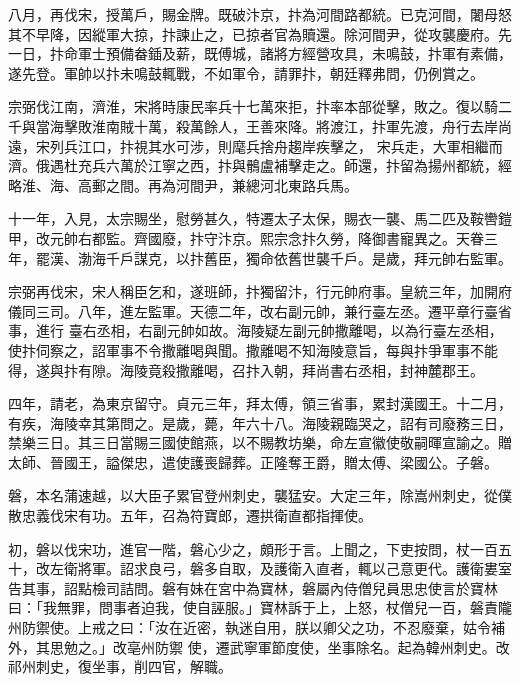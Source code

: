 \begin{pinyinscope}
 八月，再伐宋，授萬戶，賜金牌。既破汴京，抃為河間路都統。已克河間，闍母怒其不早降，因縱軍大掠，抃諫止之，已掠者官為贖還。除河間尹，從攻襲慶府。先一日，抃命軍士預備畚鍤及薪，既傅城，諸將方經營攻具，未鳴鼓，抃軍有素備，遂先登。軍帥以抃未鳴鼓輒戰，不如軍令，請罪抃，朝廷釋弗問，仍例賞之。



 宗弼伐江南，濟淮，宋將時康民率兵十七萬來拒，抃率本部從擊，敗之。復以騎二千與當海擊敗淮南賊十萬，殺萬餘人，王善來降。將渡江，抃軍先渡，舟行去岸尚遠，宋列兵江口，抃視其水可涉，則麾兵捨舟趨岸疾擊之，
 宋兵走，大軍相繼而濟。俄遇杜充兵六萬於江寧之西，抃與鶻盧補擊走之。師還，抃留為揚州都統，經略淮、海、高郵之間。再為河間尹，兼總河北東路兵馬。



 十一年，入見，太宗賜坐，慰勞甚久，特遷太子太保，賜衣一襲、馬二匹及鞍轡鎧甲，改元帥右都監。齊國廢，抃守汴京。熙宗念抃久勞，降御書寵異之。天眷三年，罷漢、渤海千戶謀克，以抃舊臣，獨命依舊世襲千戶。是歲，拜元帥右監軍。



 宗弼再伐宋，宋人稱臣乞和，遂班師，抃獨留汴，行元帥府事。皇統三年，加開府儀同三司。八年，進左監軍。天德二年，改右副元帥，兼行臺左丞。遷平章行臺省事，進行
 臺右丞相，右副元帥如故。海陵疑左副元帥撒離喝，以為行臺左丞相，使抃伺察之，詔軍事不令撒離喝與聞。撒離喝不知海陵意旨，每與抃爭軍事不能得，遂與抃有隙。海陵竟殺撒離喝，召抃入朝，拜尚書右丞相，封神麓郡王。



 四年，請老，為東京留守。貞元三年，拜太傅，領三省事，累封漢國王。十二月，有疾，海陵幸其第問之。是歲，薨，年六十八。海陵親臨哭之，詔有司廢務三日，禁樂三日。其三日當賜三國使館燕，以不賜教坊樂，命左宣徽使敬嗣暉宣諭之。贈太師、晉國王，謚傑忠，遣使護喪歸葬。正隆奪王爵，贈太傅、梁國公。子磐。



 磐，本名蒲速越，以大臣子累官登州刺史，襲猛安。大定三年，除嵩州刺史，從僕散忠義伐宋有功。五年，召為符寶郎，遷拱衛直都指揮使。



 初，磐以伐宋功，進官一階，磐心少之，頗形于言。上聞之，下吏按問，杖一百五十，改左衛將軍。詔求良弓，磐多自取，及護衛入直者，輒以己意更代。護衛婁室告其事，詔點檢司詰問。磐有妹在宮中為寶林，磐屬內侍僧兒員思忠使言於寶林曰：「我無罪，問事者迫我，使自誣服。」寶林訴于上，上怒，杖僧兒一百，磐責隴州防禦使。上戒之曰：「汝在近密，執迷自用，朕以卿父之功，不忍廢棄，姑令補外，其思勉之。」改亳州防禦
 使，遷武寧軍節度使，坐事除名。起為韓州刺史。改祁州刺史，復坐事，削四官，解職。




\end{pinyinscope}
